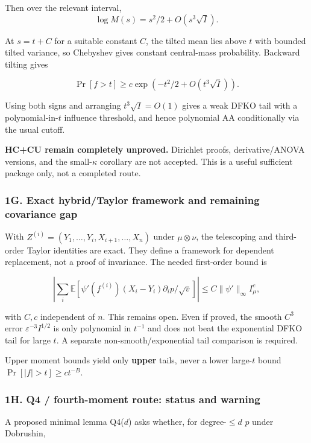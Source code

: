 Then over the relevant interval,
\[\log M(s)=s^2/2+O(s^3\sqrt I).\]

At \(s=t+C\) for a suitable constant \(C\), the tilted mean lies above \(t\) with bounded tilted variance, so Chebyshev gives constant central-mass probability. Backward tilting gives

\[\Pr[f>t]\ge c\exp(-t^2/2+O(t^3\sqrt I)).\]

Using both signs and arranging \(t^3\sqrt I=O(1)\) gives a weak DFKO tail with a polynomial-in-\(t\) influence threshold, and hence polynomial AA conditionally via the usual cutoff.

\textbf{HC+CU remain completely unproved.} Dirichlet proofs, derivative/ANOVA versions, and the small-\(\kappa\) corollary are not accepted. This is a useful sufficient package only, not a completed route.

\subsubsection{1G. Exact hybrid/Taylor framework and remaining covariance gap}\label{g.-exact-hybridtaylor-framework-and-remaining-covariance-gap}

With \(Z^{(i)}=(Y_1,\dots,Y_i,X_{i+1},\dots,X_n)\) under \(\mu\otimes\nu\), the telescoping and third-order Taylor identities are exact. They define a framework for dependent replacement, not a proof of invariance. The needed first-order bound is

\[\left|\sum_i\mathbb E\!\left[\psi'(f^{(i)})(X_i-Y_i)\partial_i p/\sqrt v\right]\right|
\le C\|\psi'\|_\infty I_\mu^c,\]

with \(C,c\) independent of \(n\). This remains open. Even if proved, the smooth \(C^3\) error \(\varepsilon^{-3}I^{1/2}\) is only polynomial in \(t^{-1}\) and does not beat the exponential DFKO tail for large \(t\). A separate non-smooth/exponential tail comparison is required.

Upper moment bounds yield only \textbf{upper} tails, never a lower large-\(t\) bound \(\Pr[|f|>t]\ge ct^{-B}\).

\subsubsection{1H. Q4 / fourth-moment route: status and warning}\label{h.-q4-fourth-moment-route-status-and-warning}

A proposed minimal lemma Q4(\(d\)) asks whether, for degree-\(\le d\) \(p\) under Dobrushin,

